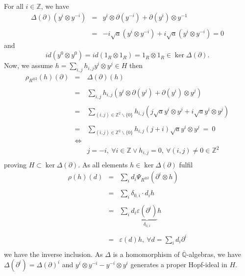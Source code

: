 \documentclass[10pt,a4paper]{article}
\newcommand{\eps}{\varepsilon}
\newcommand{\qz}{{\mathbb{Q}}}
\newcommand{\qzcl}{\overline{\qz}}
\newcommand{\bao}[1]{\begin{array}{#1}}
\newcommand{\ea}{\end{array}}
\newcommand{\tenso}[2]{#1^{\otimes #2}}
\newcommand{\twotenso}[1]{\tenso{#1}{2}}
\begin{document}
For all $i \in \mathbb{Z}$, we have
$$\bao{rcl}
\Delta(\partial)\left(y^i \otimes y^{-i}\right) &=& y^i \otimes \partial(y^{-i}) + \partial(y^i) \otimes y^{-1}\\&&\\
 &=& - i \sqrt{a} (y^i \otimes y^{-i}) + i \sqrt{a} (y^{i} \otimes y^{-i}) = 0
 \ea$$
and
$$id(y^0 \otimes y^0) = id(1_R \otimes 1_R) = 1_R \otimes 1_R \in \ker \Delta(\partial).$$
Now, we assume $h = \sum_{i,j} h_{i,j} y^{i} \otimes y^{j} \in H$ then
$$\bao{rcl}
\rho_{\twotenso{R}}(h)(\partial) &=& \Delta(\partial)(h)\\&&\\ &=& \sum_{i,j} h_{i,j} (y^i \otimes \partial(y^j) + \partial(y^i) \otimes y^j)\\
&&\\
&=& \sum_{(i,j) \in \mathbb{Z}^2 \backslash \{0\}} h_{i,j} (j \sqrt{a} y^i \otimes y^j + i \sqrt{a} y^i \otimes y^j)\\
&&\\
&=& \sum_{(i,j) \in \mathbb{Z}^2 \backslash \{0\}} h_{i,j} (j + i) \sqrt{a} y^i \otimes y^j\ = \ 0\\
&\Leftrightarrow&\\
&&j = -i,\ \forall i \in \mathbb{Z} \vee h_{i,j} = 0,\ \forall (i,j) \neq 0 \in \mathbb{Z}^2\\
\ea$$
proving $H \subset \ker \Delta(\partial)$. As all elements $h \in \ker \Delta(\partial)$ fulfil
$$\bao{rcl}
\rho(h)(d) &=& \sum_i d_i \Psi_{\twotenso{R}}(\partial^i \otimes h)\\&&\\&=& \sum_i \delta_{0,i} \cdot d_i h\\
&&\\
&=& \sum_i d_i  \underbrace{\eps(\partial^i)}_{\delta_{0,i}} h\\&&\\ &=& \eps(d) h,\ \forall d = \sum_i d_i \partial^i\\
\ea$$
we have the inverse inclusion. As $\Delta$ is a homomorphism of $\qzcl$-algebras, we have $\Delta(\partial^i) = \Delta(\partial)^i$ and $y^{i} \otimes y^{-i} - y^{-i} \otimes y^i$ generates a proper Hopf-ideal in $H$.
\end{document}

